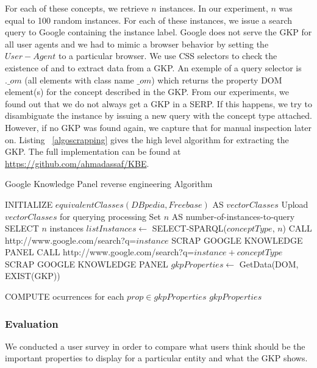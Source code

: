 \documentclass[onecolumn, crcready]{iosart2c}
\begin{document}
For each of these concepts, we retrieve $n$ instances. In our experiment, $n$ was equal to 100 random instances. For each of these instances, we issue a search query to Google containing the instance label. Google does not serve the GKP for all user agents and we had to mimic a browser behavior by setting the $User-Agent$ to a particular browser. We use CSS selectors to check the existence of and to extract data from a GKP. An exemple of a query selector is $.\_om$ (all elements with class name $\_om$) which returns the property DOM element(s) for the concept described in the GKP. From our experiments, we found out that we do not always get a GKP in a SERP. If this happens, we try to disambiguate the instance by issuing a new query with the concept type attached. However, if no GKP was found again, we capture that for manual inspection later on. Listing ~\ref{algoscrapping} gives the high level algorithm for extracting the GKP. The full implementation can be found at \url{https://github.com/ahmadassaf/KBE}.

\begin{algorithm}[h]\scriptsize
\caption{Google Knowledge Panel reverse engineering Algorithm} \label{algoscrapping}
\begin{algorithmic}[1]
    \STATE INITIALIZE $equivalentClasses(DBpedia,Freebase) $ AS $vectorClasses$
    \STATE Upload $vectorClasses$ for querying processing
    \STATE Set $n$ AS number-of-instances-to-query
	\STATE SELECT $n$ instances
	\STATE $listInstances \leftarrow$ SELECT-SPARQL($conceptType$, $n$)
			\STATE CALL http://www.google.com/search?q=$instance$
				\STATE SCRAP GOOGLE KNOWLEDGE PANEL
			\ELSE
				\STATE CALL http://www.google.com/search?q=$instance + conceptType$
 				\STATE SCRAP GOOGLE KNOWLEDGE PANEL
			\ENDIF
			\STATE $gkpProperties \leftarrow$ GetData(DOM, EXIST(GKP))
			
		\ENDFOR
	\STATE COMPUTE ocurrences for each $prop \in gkpProperties$
    \ENDFOR
    \RETURN $gkpProperties$
\end{algorithmic}
\end{algorithm}
\normalsize

\subsubsection{Evaluation}
\label{sec:evaluation}
We conducted a user survey in order to compare what users think should be the important properties to display for a particular entity and what the GKP shows.
\end{document}
